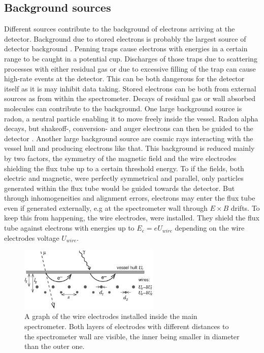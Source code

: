       \subsection{Background sources}
      \label{ch:The KATRIN experiment:sec:Experimental setup:subsec:BackgroundSources}
      Different sources contribute to the background of electrons arriving at the detector. Background due to stored electrons is probably the largest source of detector background \cite{storedElectrons}. Penning traps cause electrons with energies in a certain range to be caught in a potential cup. Discharges of those traps due to scattering processes with either residual gas or due to excessive filling of the trap can cause high-rate events at the detector. This can be both dangerous for the detector itself as it is may inhibit data taking. Stored electrons can be both from external sources as from within the spectrometer. Decays of residual gas or wall absorbed molecules can contribute to the background. One large background source is radon, a neutral particle enabling it to move freely inside the vessel. Radon alpha decays, but shakeoff-, conversion- and auger electrons can then be guided to the detector \cite{radonGoerhard, radonWandkowsky}.
      Another large background source are cosmic rays interacting with the vessel hull and producing electrons like that. This background is reduced mainly by two factors, the symmetry of the magnetic field and the wire electrodes shielding the flux tube up to a certain threshold energy.
      To if the fields, both electric and magnetic, were perfectly symmetrical and parallel, only particles generated within the flux tube would be guided towards the detector. But through inhomogeneities and alignment errors, electrons may enter the flux tube even if generated externally, e.g at the spectrometer wall through $E\times B$ drifts. To keep this from happening, the wire electrodes, were installed. They shield the flux tube against electrons with energies up to $E_e = eU_{wire}$ depending on the wire electrodes voltage $U_{wire}$. 
      \begin{figure}
		\centering
		\includegraphics[width = 0.6\textwidth]{graphics/katrinExperiment/wireElectrodes.jpg}
		\caption[Wire electrodes]{A graph of the wire electrodes installed inside the main spectrometer. Both layers of electrodes with different distances to the spectrometer wall are visible, the inner being smaller in diameter than the outer one.}
	  \end{figure}